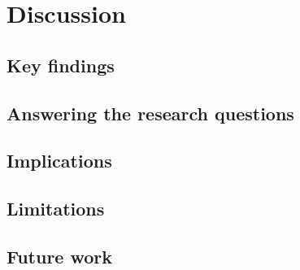 \chapter{Discussion}
\label{chap:discussion}

\section{Key findings}
\label{sec:disc-findings}

\section{Answering the research questions}
\label{sec:disc-rq}

\section{Implications}
\label{sec:disc-implications}

\section{Limitations}
\label{sec:disc-limitations}

\section{Future work}
\label{sec:disc-future}
